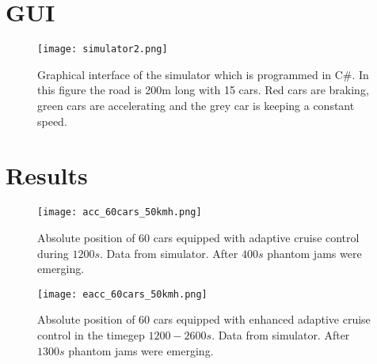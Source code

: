 \section{GUI}
\label{gui}

\begin{figure}[H]
    \begin{center}
    \texttt{[image: simulator2.png]}
    \caption{Graphical interface of the simulator which is programmed in C\#. In this figure the road is 200m long with 15 cars. Red cars are braking, green cars are accelerating and the grey car is keeping a constant speed.}
    \end{center}
\end{figure}

\section{Results}
\label{app_postime_plot}
\begin{figure}[H]
    \begin{center}
    \texttt{[image: acc\_60cars\_50kmh.png]}
    \caption{\label{acc_postime}
Absolute position of 60 cars equipped with adaptive cruise control during $ 1200
\unit{s} $. Data from simulator. After $ 400 \unit{s} $ phantom jams were emerging.}
    \end{center}
\end{figure}

\begin{figure}[H]
    \begin{center}
    \texttt{[image: eacc\_60cars\_50kmh.png]}
    \caption{\label{eacc_postime}
Absolute position of 60 cars equipped with enhanced adaptive cruise control in
the timegep $ 1200 - 2600 \unit{s} $. Data from simulator. After $ 1300 \unit{s}
$ phantom jams were emerging.}
    \end{center}
\end{figure}
